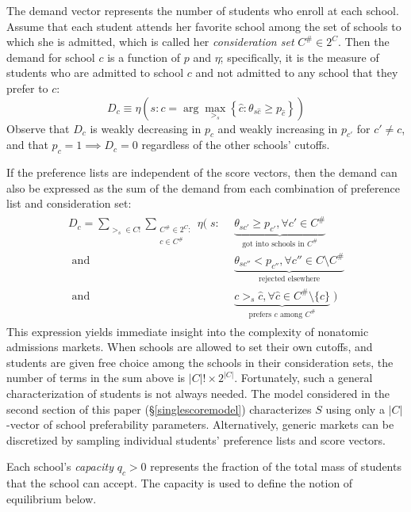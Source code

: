 \documentclass[12pt]{article}
\numberwithin{equation}{subsection}
\theoremstyle{definition}
\begin{document}
The demand vector represents the number of students who enroll at each school. Assume that each student attends her favorite school among the set of schools to which she is admitted, which is called her \emph{consideration set} $C^\# \in 2^C$. Then the demand for school $c$ is a function of $p$ and $\eta$; specifically, it is the measure of students who are admitted to school $c$ and not admitted to any school that they prefer to $c$:
\begin{equation} \label{demanddefinition}
D_c \equiv \eta\left(s: c = \arg \max_{>_s} \left\{\hat c: \theta_{s\hat c} \geq p_{\hat c} \right\}\right)
\end{equation}
Observe that $D_c$ is weakly decreasing in $p_c$ and weakly increasing in $p_{c'}$ for $c' \neq c$, and that $p_c = 1 \implies D_c = 0$ regardless of the other schools' cutoffs.

If the preference lists are independent of the score vectors, then the demand can also be expressed as the sum of the demand from each combination of preference list and consideration set:
\begin{gather} \label{demandbigsum}
\begin{aligned}
D_c = 
\sum_{>_s \in C!} \sum_{\substack{C^\# \in 2^{C}:\\ c \in C^\#}}
\eta\Big(\;s:&~~\underbrace{\theta_{sc'} \geq p_{c'}, \forall c' \in C^\#}_{\text{got into schools in } C^\# } \\
\text{ and} &~~\underbrace{\theta_{sc''} < p_{c''}, \forall c'' \in C \setminus C^\#}_{\text{rejected elsewhere}} \\
\text{ and} &~~\underbrace{c >_s \hat c, \forall \hat c \in C^\#\setminus \{c\}}_{\text{prefers } c \text{ among } C^\#} \;\Big)
\end{aligned}
\end{gather}
This expression yields immediate insight into the complexity of nonatomic admissions markets. When schools are allowed to set their own cutoffs, and students are given free choice among the schools in their consideration sets, the number of terms in the sum above is $|C|!\times2^{|C|}$. Fortunately, such a general characterization of students is not always needed. The model considered in the second section of this paper (\S\ref{singlescoremodel}) characterizes $S$ using only a $|C|$-vector of school preferability parameters. Alternatively, generic markets can be discretized by sampling individual students' preference lists and score vectors. 

Each school's \emph{capacity} $q_c > 0$ represents the fraction of the total mass of students that the school can accept. The capacity is used to define the notion of equilibrium below. 
\end{document}
